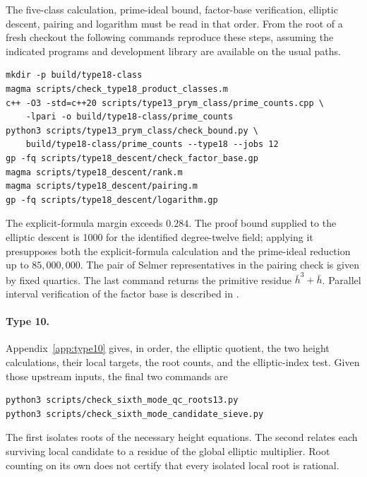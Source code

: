 The five-class calculation, prime-ideal bound, factor-base verification, elliptic descent, pairing and logarithm must be read in that order. From the root of a fresh checkout the following commands reproduce these steps, assuming the indicated programs and development library are available on the usual paths.
\begin{samepage}
\begin{Verbatim}[fontsize=\footnotesize,breaklines=true]
mkdir -p build/type18-class
magma scripts/check_type18_product_classes.m
c++ -O3 -std=c++20 scripts/type13_prym_class/prime_counts.cpp \
    -lpari -o build/type18-class/prime_counts
python3 scripts/type13_prym_class/check_bound.py \
    build/type18-class/prime_counts --type18 --jobs 12
gp -fq scripts/type18_descent/check_factor_base.gp
magma scripts/type18_descent/rank.m
magma scripts/type18_descent/pairing.m
gp -fq scripts/type18_descent/logarithm.gp
\end{Verbatim}
\end{samepage}
The explicit-formula margin exceeds \(0.284\). The proof bound supplied to the elliptic descent is 1000 for the identified degree-twelve field; applying it presupposes both the explicit-formula calculation and the prime-ideal reduction up to \(85{,}000{,}000\). The pair of Selmer representatives in the pairing check is given by fixed quartics. The last command returns the primitive residue \(\bar h^3+\bar h\). Parallel interval verification of the factor base is described in .

\paragraph{Type 10.} Appendix~\ref{app:type10} gives, in order, the elliptic quotient, the two height calculations, their local targets, the root counts, and the elliptic-index test. Given those upstream inputs, the final two commands are
\begin{samepage}
\begin{Verbatim}[fontsize=\footnotesize,breaklines=true]
python3 scripts/check_sixth_mode_qc_roots13.py
python3 scripts/check_sixth_mode_candidate_sieve.py
\end{Verbatim}
\end{samepage}
The first isolates roots of the necessary height equations. The second relates each surviving local candidate to a residue of the global elliptic multiplier. Root counting on its own does not certify that every isolated local root is rational.

